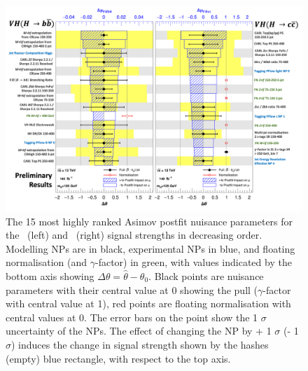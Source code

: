 \begin{figure}[h!]
    \centering
    \includegraphics[width=\textwidth]{Images/VH/Fit/fromSlides/ranking.png}
    \caption{The 15 most highly ranked Asimov postfit nuisance parameters for the \vhb\ (left) and \vhc\ (right) signal strengths in decreasing order. Modelling NPs are in black, experimental NPs in blue, and floating normalisation (and $\gamma$-factor) in green, with values indicated by the bottom axis showing $\Delta \theta = \hat{\theta} - \theta_0$. Black points are nuisance parameters with their central value at 0 showing the pull ($\gamma$-factor with central value at 1), red points are floating normalisation with central values at 0. The error bars on the point show the 1 $\sigma$ uncertainty of the NPs. The effect of changing the NP by + 1 $\sigma$ (- 1 $\sigma$) induces the change in signal strength shown by the hashes (empty) blue rectangle, with respect to the top axis.}
    \label{fig:rankingPostfit}
\end{figure} 


